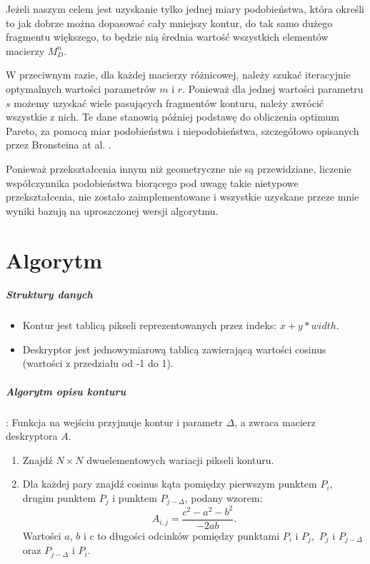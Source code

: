 Jeżeli naszym celem jest uzyskanie tylko jednej miary podobieństwa, która
określi to jak dobrze można dopasować cały mniejszy kontur, do tak samo dużego
fragmentu większego, to będzie nią średnia wartość wszystkich elementów
macierzy $M_{D}^{n}$.

W przeciwnym razie, dla każdej macierzy różnicowej, należy szukać iteracyjnie
optymalnych wartości parametrów $m$ i $r$. Ponieważ dla jednej wartości
parametru $s$ możemy uzyskać wiele pasujących fragmentów konturu, należy
zwrócić wszystkie z nich. Te dane stanowią później podstawę do obliczenia
optimum Pareto, za pomocą miar podobieństwa i niepodobieństwa, szczegółowo
opisanych przez Bronsteina at al. \cite{partial_similarity}.

Ponieważ przekształcenia innym niż geometryczne nie są przewidziane, liczenie
współczynnika podobieństwa biorącego pod uwagę takie nietypowe przekształcenia,
nie zostało zaimplementowane i wszystkie uzyskane przeze mnie wyniki bazują na
uproszczonej wersji algorytmu.

\section{Algorytm}

\subparagraph{Struktury danych} 

\begin{itemize} \item Kontur jest tablicą pikseli reprezentowanych przez
    indeks: $x + y*width$. \item Deskryptor jest jednowymiarową tablicą
    zawierającą wartości cosinus (wartości z przedziału od -1 do 1).
\end{itemize}

\subparagraph{Algorytm opisu konturu}: Funkcja na wejściu przyjmuje kontur i
parametr $\Delta$, a zwraca macierz deskryptora $A$.  

\begin{enumerate} \item Znajdź $N \times N$ dwuelementowych wariacji pikseli
    konturu. \item Dla każdej pary znajdź cosinus kąta pomiędzy pierwszym
    punktem $P_{i}$, drugim punktem $P_{j}$ i punktem $P_{j-\Delta}$, podany
    wzorem: $$A_{i,j} = \frac{c^2 - a^2 - b^2}{-2ab}.$$ Wartości $a$, $b$ i $c$
    to długości odcinków pomiędzy punktami $P_i$ i $P_j,$ $P_j$ i
    $P_{j-\Delta}$ oraz $P_{j-\Delta}$ i $P_i$. \end{enumerate}

